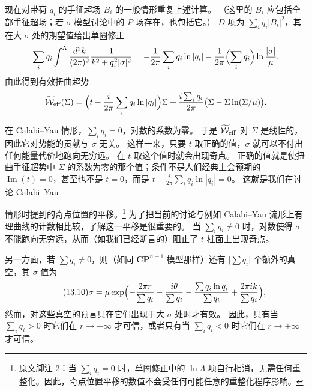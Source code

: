 现在对带荷 $q_i$ 的手征超场 $B_i$ 的一般情形重复上述计算。
（这里的 $B_i$ 应包括全部手征超场；若 $\sigma$ 模型讨论中的 $P$ 场存在，也包括它。）
$D$ 项为 $\sum_i q_i|B_i|^2$，其在大 $\sigma$ 处的期望值给出单圈修正
\[
\sum_i q_i\int^\Lambda\frac{d^2k}{(2\pi)^2}\frac{1}{k^2+q_i^2|\sigma|^2}
=-\frac{1}{2\pi}\sum_i q_i\ln|q_i|
-\frac{1}{2\pi}\Bigl(\sum_i q_i\Bigr)\ln\frac{|\sigma|}{\mu},
\]
由此得到有效扭曲超势
\[
\widetilde{\mathcal{W}}_{\rm eff}(\Sigma)
=\Bigl(t-\frac{i}{2\pi}\sum_i q_i\ln|q_i|\Bigr)\Sigma
+\frac{i\sum_i q_i}{2\pi}\bigl(\Sigma-\Sigma\ln(\Sigma/\mu)\bigr).
\]


在 Calabi--Yau 情形，$\sum_i q_i=0$，对数的系数为零。
于是 $\widetilde{\mathcal{W}}_{\rm eff}$ 对 $\Sigma$ 是线性的，因此它对势能的贡献与 $\sigma$ 无关。
这样一来，只要 $t$ 取正确的值，$\sigma$ 就可以不付出任何能量代价地跑向无穷远。
在 $t$ 取这个值时就会出现奇点。
正确的值就是使扭曲手征超势中 $\Sigma$ 的系数为零的那个值；条件不是人们经典上会预期的 $\operatorname{Im}(t)=0$，甚至也不是 $t=0$，而是 $t-\frac{i}{2\pi}\sum_i q_i\ln|q_i|=0$。
这就是我们在讨论 Calabi--Yau


情形时提到的奇点位置的平移。\footnote{原文脚注 2：当 $\sum_i q_i=0$ 时，单圈修正中的 $\ln\Lambda$ 项自行相消，无需任何重整化。因此，奇点位置平移的数值不会受任何可能任意的重整化程序影响。}
为了把当前的讨论与例如 Calabi--Yau 流形上有理曲线的计数相比较，了解这一平移是很重要的。
当 $\sum_i q_i\ne0$ 时，对数使得 $\sigma$ 不能跑向无穷远，从而（如我们已经断言的）阻止了 $t$ 柱面上出现奇点。

另一方面，若 $\sum q_i\ne0$，则（如同 $\mathbf{CP}^{n-1}$ 模型那样）还有 $\bigl|\sum q_i\bigr|$ 个额外的真空，其 $\sigma$ 值为
\begin{equation}
  \tag{13.10}
  \label{eq:13-10}
  \sigma=\mu\exp\Bigl(
  -\frac{2\pi r}{\sum q_i}
  -\frac{i\theta}{\sum q_i}
  -\frac{\sum q_i\ln q_i}{\sum q_i}
  +\frac{2\pi ik}{\sum q_i}\Bigr),
\end{equation}
然而，对这些真空的预言只在它们出现于大 $\sigma$ 处时才有效。
因此，只有当 $\sum_i q_i>0$ 时它们在 $r\to-\infty$ 才可信，或者只有当 $\sum_i q_i<0$ 时它们在 $r\to+\infty$ 才可信。

